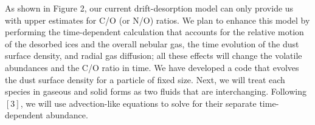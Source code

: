 \documentclass[12pt, letterpaper]{article}
\begin{document}
As shown in Figure 2, our current drift-desorption model can only provide us with upper estimates for C/O (or N/O) ratios. We plan to enhance this model by performing the time-dependent calculation that accounts for the relative motion of the desorbed ices and the overall nebular gas, the time evolution of the dust surface density,  and radial gas diffusion; all these effects will change the volatile abundances and the C/O ratio in time. We have developed a code that evolves the dust surface density for a particle of fixed size. Next, we will treat  each species in gaseous and solid forms as two fluids that are interchanging. Following $[3]$, we will use advection-like equations to solve for their separate time-dependent abundance.





%

\footnotesize
\end{document}

